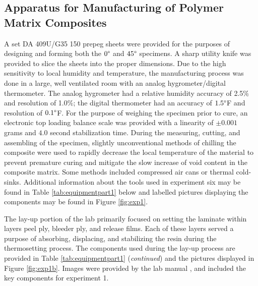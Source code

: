 \subsection{Apparatus for Manufacturing of Polymer Matrix Composites}
\tab A set DA 409U/G35 150 prepeg sheets were provided for the purposes of designing and forming both the $0\degree$ and $45\degree$ specimens.  A sharp utility knife was provided to slice the sheets into the proper dimensions.  Due to the high sensitivity to local humidity and temperature, the manufacturing process was done in a large, well ventilated room with an analog hygrometer/digital thermometer.  The analog hygrometer had a relative humidity accuracy of 2.5\% and resolution of 1.0\%; the digital thermometer had an accuracy of $1.5\degree$F and resolution of $0.1\degree$F.  For the purpose of weighing the specimen prior to cure, an electronic top loading balance scale was provided with a linearity of $\pm 0.001$ grams and $4.0$ second stabilization time.  During the measuring, cutting, and assembling of the specimen, slightly unconventional methods of chilling the composite were used to rapidly decrease the local temperature of the material to prevent premature curing and mitigate the slow increase of void content in the composite matrix.  Some methods included compressed air cans or thermal cold-sinks.  Additional information about the tools used in experiment six may be found in Table \ref{tab:equipmentpart1} below and labelled pictures displaying the components may be found in Figure \ref{fig:exp1}.

The lay-up portion of the lab primarily focused on setting the laminate within layers peel ply, bleeder ply, and release films.  Each of these layers served a purpose of absorbing, displacing, and stabilizing the resin during the thermosetting process.  The components used during the lay-up process are provided in Table \ref{tab:equipmentpart1} (\textit{continued}) and the pictures displayed in Figure \ref{fig:exp1b}.  Images were provided by the lab manual \cite{labmanual}, and included the key components for experiment 1.

